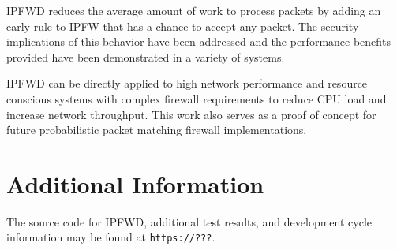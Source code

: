 \documentclass[journal]{IEEEtran}
\begin{document}
  IPFWD reduces the average amount of work to process packets by adding an
  early rule to IPFW that has a chance to accept any packet. The security
  implications of this behavior have been addressed and the performance
  benefits provided have been demonstrated in a variety of systems.

  IPFWD can be directly applied to high network performance and resource
  conscious systems with complex firewall requirements to reduce CPU load and
  increase network throughput. This work also serves as a proof of concept for
  future probabilistic packet matching firewall implementations.


\appendices
\section{Additional Information}
  The source code for IPFWD, additional test results, and development cycle
  information may be found at \texttt{https://???}.



\ifCLASSOPTIONcaptionsoff
  \newpage
\fi


\printbibliography

\end{document}
